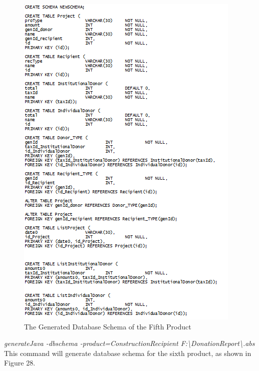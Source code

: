 \documentclass[runningheads,a4paper]{llncs}
\begin{document}
\begin{figure}
	\centering
	\includegraphics[scale=0.9]{create5.png}
	\caption{The Generated Database Schema of the Fifth Product}
	\label{Figure 27}
\end{figure}

\emph{generateJava -dbschema -product=ConstructionRecipient F:\textbackslash DonationReport\textbackslash *.abs}\\

This command will generate database schema for the sixth product, as shown in Figure 28.\\
\end{document}
